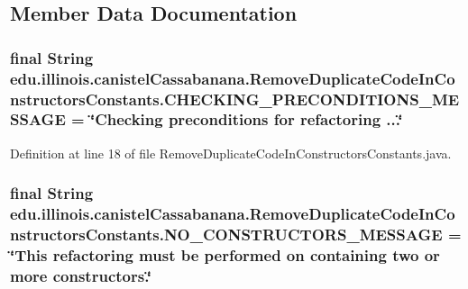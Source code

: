 \subsection{Member Data Documentation}
\hypertarget{classedu_1_1illinois_1_1canistelCassabanana_1_1RemoveDuplicateCodeInConstructorsConstants_af08e2ca4fcb3b7e1dd047b88a278d125}{
\subsubsection[{CHECKING\_\-PRECONDITIONS\_\-MESSAGE}]{\setlength{\rightskip}{0pt plus 5cm}final String {\bf edu.illinois.canistelCassabanana.RemoveDuplicateCodeInConstructorsConstants.CHECKING\_\-PRECONDITIONS\_\-MESSAGE} = \char`\"{}Checking preconditions for refactoring ...\char`\"{}}}
\label{classedu_1_1illinois_1_1canistelCassabanana_1_1RemoveDuplicateCodeInConstructorsConstants_af08e2ca4fcb3b7e1dd047b88a278d125}


Definition at line 18 of file RemoveDuplicateCodeInConstructorsConstants.java.

\hypertarget{classedu_1_1illinois_1_1canistelCassabanana_1_1RemoveDuplicateCodeInConstructorsConstants_a76b9ae1d61eebfbffcef6b6a07e99fa3}{
\subsubsection[{NO\_\-CONSTRUCTORS\_\-MESSAGE}]{\setlength{\rightskip}{0pt plus 5cm}final String {\bf edu.illinois.canistelCassabanana.RemoveDuplicateCodeInConstructorsConstants.NO\_\-CONSTRUCTORS\_\-MESSAGE} = \char`\"{}This refactoring must be performed on containing two or more constructors.\char`\"{}}}
\label{classedu_1_1illinois_1_1canistelCassabanana_1_1RemoveDuplicateCodeInConstructorsConstants_a76b9ae1d61eebfbffcef6b6a07e99fa3}


